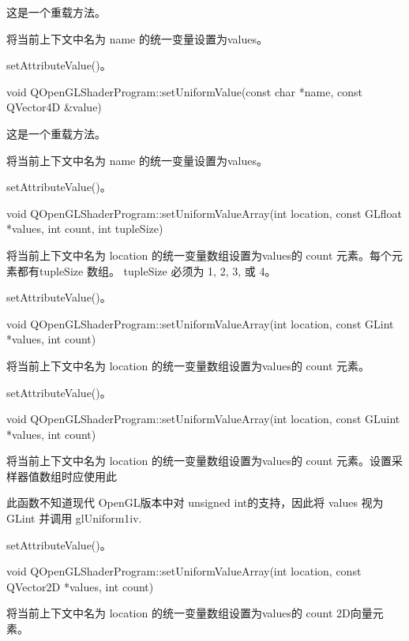 这是一个重载方法。

将当前上下文中名为 name 的统一变量设置为values。

\begin{seeAlso}
setAttributeValue()。
\end{seeAlso}

void QOpenGLShaderProgram::setUniformValue(const char *name, const QVector4D \&value)

这是一个重载方法。

将当前上下文中名为 name 的统一变量设置为values。

\begin{seeAlso}
setAttributeValue()。
\end{seeAlso}

void QOpenGLShaderProgram::setUniformValueArray(int location, const GLfloat *values, int count, int tupleSize)

将当前上下文中名为 location 的统一变量数组设置为values的 count 元素。每个元素都有tupleSize 数组。 tupleSize 必须为 1, 2, 3, 或 4。

\begin{seeAlso}
setAttributeValue()。
\end{seeAlso}

void QOpenGLShaderProgram::setUniformValueArray(int location, const GLint *values, int count)

将当前上下文中名为 location 的统一变量数组设置为values的 count 元素。

\begin{seeAlso}
setAttributeValue()。
\end{seeAlso}

void QOpenGLShaderProgram::setUniformValueArray(int location, const GLuint *values, int count)

将当前上下文中名为 location 的统一变量数组设置为values的 count 元素。设置采样器值数组时应使用此

\begin{notice}
此函数不知道现代 OpenGL版本中对 unsigned int的支持，因此将 values 视为 GLint 并调用 glUniform1iv.
\end{notice}

\begin{seeAlso}
setAttributeValue()。
\end{seeAlso}

void QOpenGLShaderProgram::setUniformValueArray(int location, const QVector2D *values, int count)

将当前上下文中名为 location 的统一变量数组设置为values的 count 2D向量元素。



